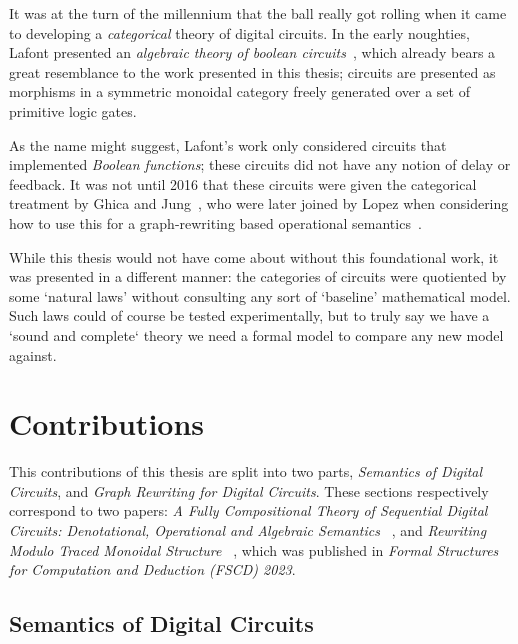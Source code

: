 It was at the turn of the millennium that the ball really got rolling when it
came to developing a \emph{categorical} theory of digital circuits.
In the early noughties, Lafont presented an
\emph{algebraic theory of boolean circuits}~\cite{lafont2003algebraic}, which
already bears a great resemblance to the work presented in this thesis; circuits
are presented as morphisms in a symmetric monoidal category freely generated
over a set of primitive logic gates.

As the name might suggest, Lafont's work only considered circuits that
implemented \emph{Boolean functions}; these circuits did not have any notion of
delay or feedback.
It was not until 2016 that these circuits were given the categorical treatment
by Ghica and Jung~\cite{ghica2016categorical}, who were later joined
by Lopez when considering how to use this for a graph-rewriting based
operational semantics~\cite{ghica2017diagrammatic}.

While this thesis would not have come about without this foundational work, it
was presented in a different manner: the categories of circuits were quotiented
by some `natural laws' without consulting any sort of `baseline' mathematical
model.
Such laws could of course be tested experimentally, but to truly say we have a
`sound and complete` theory we need a formal model to compare any new model
against.


\section{Contributions}

This contributions of this thesis are split into two parts,
\emph{Semantics of Digital Circuits}, and
\emph{Graph Rewriting for Digital Circuits}.
These sections respectively correspond to two papers:
\emph{%
    A Fully Compositional Theory of Sequential Digital Circuits:
    Denotational, Operational and Algebraic Semantics%
}~\cite{ghica2024fully}, and \emph{%
    Rewriting Modulo Traced Monoidal Structure%
}~\cite{ghica2023rewriting}, which was published in
\emph{Formal Structures for Computation and Deduction (FSCD) 2023}.

\subsection{Semantics of Digital Circuits}

